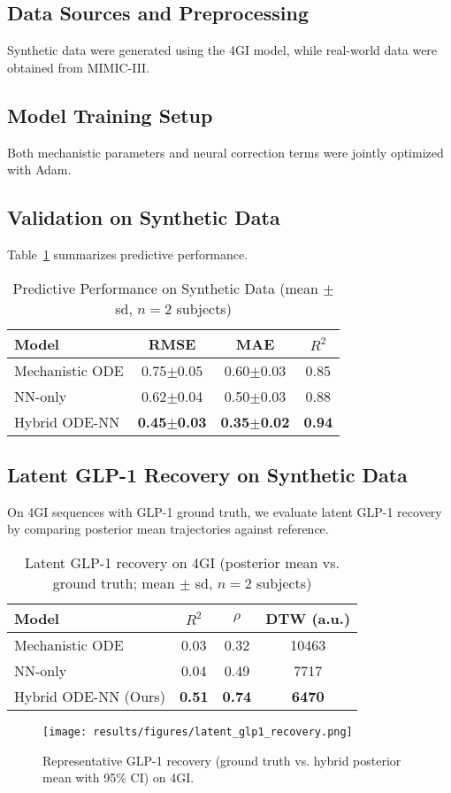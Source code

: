 \documentclass[9pt,shortpaper,twoside,web]{ieeecolor}
\begin{document}
\subsection{Data Sources and Preprocessing}\label{subsec:data_sources}
Synthetic data were generated using the 4GI model, while real-world data were obtained from MIMIC-III.
\subsection{Model Training Setup}\label{subsec:model_training}
Both mechanistic parameters and neural correction terms were jointly optimized with Adam.
\subsection{Validation on Synthetic Data}
Table~\ref{tab:synthetic_results} summarizes predictive performance.
\begin{table}[h]
\centering
\caption{Predictive Performance on Synthetic Data (mean $\pm$ sd, $n=2$ subjects)}
\label{tab:synthetic_results}
\begin{tabular}{lccc}
\toprule
Model & RMSE & MAE & $R^2$ \\
\midrule
Mechanistic ODE & 0.75$\pm$0.05 & 0.60$\pm$0.03 & 0.85 \\
NN-only & 0.62$\pm$0.04 & 0.50$\pm$0.03 & 0.88 \\
Hybrid ODE-NN & \textbf{0.45$\pm$0.03} & \textbf{0.35$\pm$0.02} & \textbf{0.94} \\
\bottomrule
\end{tabular}
\end{table}
\subsection{Latent GLP-1 Recovery on Synthetic Data}\label{subsec:latent_recovery}
On 4GI sequences with GLP-1 ground truth, we evaluate latent GLP-1 recovery by comparing posterior mean trajectories against reference.
\begin{table}[h]
\centering
\caption{Latent GLP-1 recovery on 4GI (posterior mean vs. ground truth; mean $\pm$ sd, $n=2$ subjects)}
\label{tab:latent_glp1}
\begin{tabular}{lccc}
\toprule
Model & $R^2$ & $\rho$ & DTW (a.u.) \\
\midrule
Mechanistic ODE & 0.03 & 0.32 & 10463 \\
NN-only & 0.04 & 0.49 & 7717 \\
Hybrid ODE-NN (Ours) & \textbf{0.51} & \textbf{0.74} & \textbf{6470} \\
\bottomrule
\end{tabular}
\end{table}
\begin{figure}[h]
\centering
\texttt{[image: results/figures/latent\_glp1\_recovery.png]}
\caption{Representative GLP-1 recovery (ground truth vs. hybrid posterior mean with 95\% CI) on 4GI.}
\label{fig:latent_glp1_recovery}
\end{figure}
\end{document}
